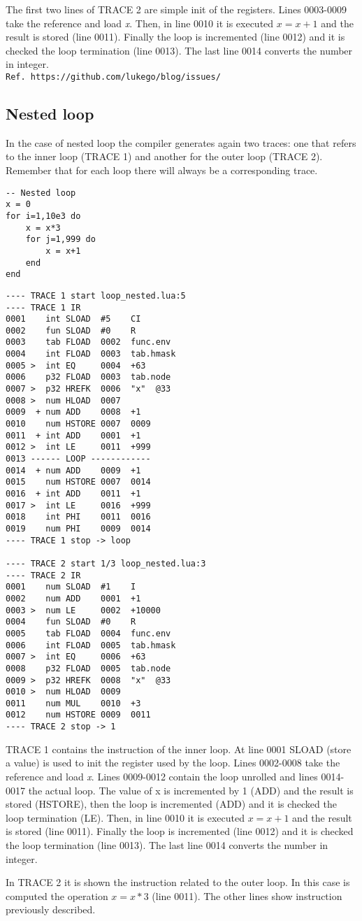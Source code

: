 The first two lines of TRACE 2 are simple init of the registers. Lines 0003-0009 take the reference and load \textit{x}. Then, in line 0010 it is executed $x=x+1$ and the result is stored (line 0011). Finally the loop is incremented (line 0012) and it is checked the loop termination (line 0013). The last line 0014 converts the number in integer.\\
\texttt{Ref. https://github.com/lukego/blog/issues/}\\

\subsection{Nested loop}
In the case of nested loop the compiler generates again two traces: one that refers to the inner loop (TRACE 1) and another for the outer loop (TRACE 2). Remember that for each loop there will always be a corresponding trace.
\begin{lstlisting}[style=LuaStyle]
-- Nested loop
x = 0
for i=1,10e3 do
	x = x*3
	for j=1,999 do
		x = x+1
	end
end
\end{lstlisting}

\begin{lstlisting}[style=DumpStyle]
---- TRACE 1 start loop_nested.lua:5
---- TRACE 1 IR
0001    int SLOAD  #5    CI
0002    fun SLOAD  #0    R
0003    tab FLOAD  0002  func.env
0004    int FLOAD  0003  tab.hmask
0005 >  int EQ     0004  +63 
0006    p32 FLOAD  0003  tab.node
0007 >  p32 HREFK  0006  "x"  @33
0008 >  num HLOAD  0007
0009  + num ADD    0008  +1  
0010    num HSTORE 0007  0009
0011  + int ADD    0001  +1  
0012 >  int LE     0011  +999
0013 ------ LOOP ------------
0014  + num ADD    0009  +1  
0015    num HSTORE 0007  0014
0016  + int ADD    0011  +1  
0017 >  int LE     0016  +999
0018    int PHI    0011  0016
0019    num PHI    0009  0014
---- TRACE 1 stop -> loop

---- TRACE 2 start 1/3 loop_nested.lua:3
---- TRACE 2 IR
0001    num SLOAD  #1    I
0002    num ADD    0001  +1  
0003 >  num LE     0002  +10000
0004    fun SLOAD  #0    R
0005    tab FLOAD  0004  func.env
0006    int FLOAD  0005  tab.hmask
0007 >  int EQ     0006  +63 
0008    p32 FLOAD  0005  tab.node
0009 >  p32 HREFK  0008  "x"  @33
0010 >  num HLOAD  0009
0011    num MUL    0010  +3  
0012    num HSTORE 0009  0011
---- TRACE 2 stop -> 1
\end{lstlisting}

TRACE 1 contains the instruction of the inner loop. At line 0001 SLOAD (store a value) is used to init the register used by the loop. Lines 0002-0008 take the reference and load \textit{x}. Lines 0009-0012 contain the loop unrolled and lines 0014-0017 the actual loop. The value of x is incremented by 1 (ADD) and the result is stored (HSTORE), then the loop is incremented (ADD) and  it is checked the loop termination (LE). Then, in line 0010 it is executed $x=x+1$ and the result is stored (line 0011). Finally the loop is incremented (line 0012) and it is checked the loop termination (line 0013). The last line 0014 converts the number in integer.

In TRACE 2 it is shown the instruction related to the outer loop. In this case is computed the operation $x=x*3$ (line 0011). The other lines show instruction previously described.\\